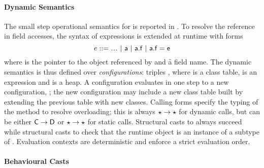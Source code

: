 \documentclass[acmlarge, anonymous, authordraft]{acmart}
\newcommand{\FZ}[1]{\textbf{FZ: #1}}
\begin{document}




\paragraph{Dynamic Semantics}
The small  step operational semantics for \kafka is reported in .  To resolve the \this reference in field accesses, the syntax of expressions is extended at runtime with forms 
%
\[ e  ::= \dots \B \a \B \FReadR\a\f \B \FWriteR\a\f\e \]
%
where \a is the pointer to the object referenced by \this and \f a field name.
The dynamic semantics is thus defined over \emph{configurations}: triples \K\e\s, where \K is a class
table, \e is an expression and \s is a heap.  A configuration evaluates in one
step to a new configuration, \Reduce \K\e\s\Kp\ep\sp;  the new configuration may
include a new class table built by extending the previous table with new
classes.
%
Calling forms specify the
typing of the method to resolve overloading; this is always \(\star \to \star\) for dynamic calls, but can be either \({\sf{C}} \to {\sf{D}}\) or \(\star \to \star\) for  static calls.
Structural casts to \any always succeed
while structural casts to \C check that the runtime object is an instance of a
subtype of \C.  
Evaluation contexts are deterministic and enforce a strict evaluation order.

\paragraph{Behavioural Casts}
\end{document}
